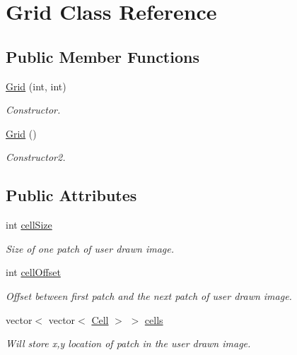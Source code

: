 \hypertarget{classGrid}{\section{\-Grid \-Class \-Reference}
\label{classGrid}
}
\subsection*{\-Public \-Member \-Functions}
\begin{DoxyCompactItemize}
\item 
\hypertarget{classGrid_a2a809d16ae2ba160bd3a0e7a8f6406df}{\hyperlink{classGrid_a2a809d16ae2ba160bd3a0e7a8f6406df}{\-Grid} (int, int)}\label{classGrid_a2a809d16ae2ba160bd3a0e7a8f6406df}

\begin{DoxyCompactList}\small\item\em \-Constructor. \end{DoxyCompactList}\item 
\hypertarget{classGrid_a4ac9ff4f63552b4c61ff90fcb35ad66c}{\hyperlink{classGrid_a4ac9ff4f63552b4c61ff90fcb35ad66c}{\-Grid} ()}\label{classGrid_a4ac9ff4f63552b4c61ff90fcb35ad66c}

\begin{DoxyCompactList}\small\item\em \-Constructor2. \end{DoxyCompactList}\end{DoxyCompactItemize}
\subsection*{\-Public \-Attributes}
\begin{DoxyCompactItemize}
\item 
\hypertarget{classGrid_a0c0c3a73c34785ee823cd08612efd4da}{int \hyperlink{classGrid_a0c0c3a73c34785ee823cd08612efd4da}{cell\-Size}}\label{classGrid_a0c0c3a73c34785ee823cd08612efd4da}

\begin{DoxyCompactList}\small\item\em \-Size of one patch of user drawn image. \end{DoxyCompactList}\item 
\hypertarget{classGrid_a28a6e74ffa7a0e8a2c885c269c2d1a37}{int \hyperlink{classGrid_a28a6e74ffa7a0e8a2c885c269c2d1a37}{cell\-Offset}}\label{classGrid_a28a6e74ffa7a0e8a2c885c269c2d1a37}

\begin{DoxyCompactList}\small\item\em \-Offset between first patch and the next patch of user drawn image. \end{DoxyCompactList}\item 
vector$<$ vector$<$ \hyperlink{classCell}{\-Cell} $>$ $>$ \hyperlink{classGrid_ade574c0d539d2b33b1cb57f6fd47dd2f}{cells}
\begin{DoxyCompactList}\small\item\em \-Will store x,y location of patch in the user drawn image. \end{DoxyCompactList}\end{DoxyCompactItemize}


